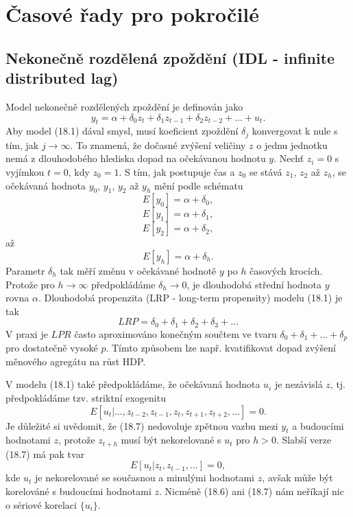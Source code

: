 \chapter{Časové řady pro pokročilé}

\section{Nekonečně rozdělená zpoždění (IDL - infinite distributed lag)}

Model nekonečně rozdělených zpoždění je definován jako
\begin{equation}
y_t = \alpha + \delta_0 z_t + \delta_1 z_{t-1} + \delta_2 z_{t-2} + ... + u_t.
\end{equation}
Aby model (18.1) dával smysl, musí koeficient zpoždění $\delta_j$ konvergovat k nule s tím, jak $j 
\rightarrow \infty$. To znamená, že dočasné zvýšení veličiny 
$z$ o jednu jednotku nemá z dlouhodobého 
hlediska dopad na očekávanou hodnotu $y$. Nechť $z_i = 0$ s vyjímkou 
$t = 0$, kdy $z_0 = 1$. S tím, jak postupuje čas a $z_0$ 
se stává $z_1$, $z_2$ až $z_h$, se očekávaná hodnota $y_0$, 
$y_1$, $y_2$ až $y_h$ mění 
podle schématu
\begin{equation}
E[y_0] = \alpha + \delta_0,
\end{equation}
\begin{equation}
E[y_1] = \alpha + \delta_1,
\end{equation}
\begin{equation}
E[y_2] = \alpha + \delta_2,
\end{equation}
až
\begin{equation}
E[y_h] = \alpha + \delta_h.
\end{equation}
Parametr $\delta_h$ tak měří změnu v očekávané hodnotě $y$ po $h$ časových 
krocích. Protože pro $h \rightarrow \infty$ předpokládáme $\delta_h 
\rightarrow 0$, je dlouhodobá střední hodnota $y$ rovna $\alpha$. Dlouhodobá propenzita (LRP - long-term propensity) modelu (18.1) je tak
\begin{equation}
LRP = \delta_0 + \delta_1 + \delta_2 + \delta_3 + ...
\end{equation}
V praxi je $LPR$ často aproximováno konečným součtem ve tvaru $\delta_0 + 
\delta_1 + ... + \delta_p$ pro dostatečně vysoké $p$. Tímto způsobem lze např. kvatifikovat dopad zvýšení 
měnového agregátu na růst HDP.

V modelu (18.1) také předpokládáme, že očekávaná hodnota $u_i$ 
je nezávislá $z$, tj. předpokládáme tzv. striktní exogenitu
\begin{equation}
E[u_t|...,z_{t-2}, z_{t-1}, z_t, z_{t+1}, z_{t+2}, ...] = 0.
\end{equation}
Je důležité si uvědomit, že (18.7) nedovoluje zpětnou vazbu mezi $y_t$ a budoucími hodnotami $z$, protože $z_{t+h}$ musí být nekorelované s 
$u_t$ pro $h > 0$. Slabší verze (18.7) má pak tvar
\begin{equation}
E[u_t | z_t, z_{t-1}, ...] = 0,
\end{equation}
kde $u_t$ je nekorelované se současnou a minulými hodnotami $z$, avšak může být korelováné s 
budoucími hodnotami $z$. Nicméně (18.6) ani (18.7) nám neříkají nic o sériové korelaci $\{u_i\}$.

